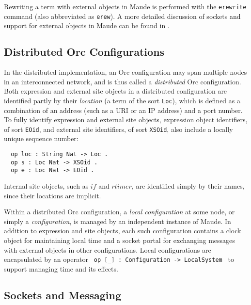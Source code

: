 \documentclass{eptcs}
\begin{document}
Rewriting a term with external objects in Maude is performed with the \texttt{erewrite} command (also abbreviated as \texttt{erew}). A more detailed discussion of sockets and support for external objects in Maude can be found in \cite{maude-book}.



\subsection{Distributed Orc Configurations}

In the distributed implementation, an Orc configuration may span multiple nodes in an interconnected network, and is thus called a \emph{distributed} Orc configuration. Both expression and external site objects in a distributed configuration are identified partly by their \emph{location} (a term of the sort \texttt{Loc}), which is defined as a combination of an address (such as a URI or an IP address) and a port number. To fully identify expression and external site objects, expression object identifiers, of sort \texttt{EOid}, and external site identifiers, of sort \texttt{XSOid}, also include a locally unique sequence number:

\begin{small}
\begin{verbatim}
  op loc : String Nat -> Loc .
  op s : Loc Nat -> XSOid .     
  op e : Loc Nat -> EOid .
\end{verbatim}
\end{small}

Internal site objects, such as $\mathit{if}$ and $\mathit{rtimer}$, are identified simply by their names, since their locations are implicit.

Within a distributed Orc configuration, a \emph{local configuration} at some node, or simply a \emph{configuration}, is managed by an independent instance of Maude. In addition to expression and site objects, each such configuration contains a clock object for maintaining local time and a socket portal for exchanging messages with external objects in other configurations. Local configurations are encapsulated by an operator \texttt{ op [\_] :~Configuration -> LocalSystem } to support managing time and its effects. 


\subsection{Sockets and Messaging}\label{sec:sockets-messaging}
\end{document}
